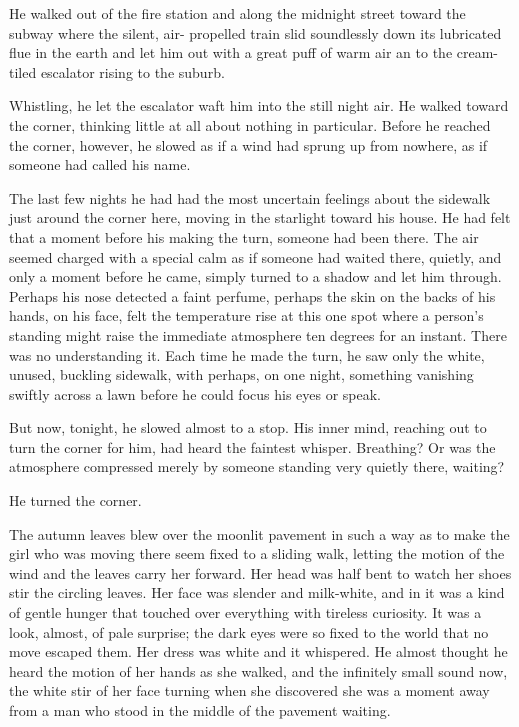 \documentclass[10pt,a4paper]{article}
\begin{document}
He walked out of the fire station and along the 
midnight street toward the subway where the silent, air- 
propelled train slid soundlessly down its lubricated flue in 
the earth and let him out with a great puff of warm air an to 
the cream-tiled escalator rising to the suburb. 

Whistling, he let the escalator waft him into the still 
night air. He walked toward the corner, thinking little at all 
about nothing in particular. Before he reached the corner, 
however, he slowed as if a wind had sprung up from 
nowhere, as if someone had called his name. 

The last few nights he had had the most uncertain 
feelings about the sidewalk just around the corner here, 
moving in the starlight toward his house. He had felt that a 
moment before his making the turn, someone had been 
there. The air seemed charged with a special calm as if 
someone had waited there, quietly, and only a moment 
before he came, simply turned to a shadow and let him 
through. Perhaps his nose detected a faint perfume, perhaps 
the skin on the backs of his hands, on his face, felt the 
temperature rise at this one spot where a person's standing 
might raise the immediate atmosphere ten degrees for an 
instant. There was no understanding it. Each time he made 
the turn, he saw only the white, unused, buckling sidewalk, 
with perhaps, on one night, something vanishing swiftly 
across a lawn before he could focus his eyes or speak. 

But now, tonight, he slowed almost to a stop. His 
inner mind, reaching out to turn the corner for him, had 
heard the faintest whisper. Breathing? Or was the 
atmosphere compressed merely by someone standing very 
quietly there, waiting? 

He turned the corner. 

The autumn leaves blew over the moonlit pavement 
in such a way as to make the girl who was moving there 
seem fixed to a sliding walk, letting the motion of the wind 
and the leaves carry her forward. Her head was half bent to 
watch her shoes stir the circling leaves. Her face was slender 
and milk-white, and in it was a kind of gentle hunger that 
touched over everything with tireless curiosity. It was a look, 
almost, of pale surprise; the dark eyes were so fixed to the 
world that no move escaped them. Her dress was white and 
it whispered. He almost thought he heard the motion of her 
hands as she walked, and the infinitely small sound now, the 
white stir of her face turning when she discovered she was a 
moment away from a man who stood in the middle of the 
pavement waiting. 
\end{document}
